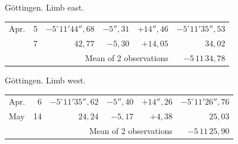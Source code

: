 \noindent\begin{minipage}[t]{.495\textwidth}\centering Göttingen. Limb east.\par\smallskip
{\scriptsize\setlength{\tabcolsep}{1pt}\renewcommand{\arraystretch}{1.2}\begin{tabular}{lr|r|r|r|r|}
Apr.&5&$-5^\circ11'44''{,}68$&$-5''{,}31$&$+14''{,}46$&$-5^\circ11'35''{,}53$\\
&7&$42{,}77$&$-5{,}30$&$+14{,}05$&$34{,}02$\\
\cline{6-6}\multicolumn{5}{r}{Mean of 2 observations}&$-5\,11\,34{,}78$
\end{tabular}}\end{minipage}\hfill\begin{minipage}[t]{.495\textwidth}\centering Göttingen. Limb west.\par\smallskip
{\scriptsize\setlength{\tabcolsep}{1pt}\renewcommand{\arraystretch}{1.2}\begin{tabular}{lr|r|r|r|r}
Apr.&6&$-5^\circ11'35''{,}62$&$-5''{,}40$&$+14''{,}26$&$-5^\circ11'26''{,}76$\\
May&14&$24{,}24$&$-5{,}17$&$+4{,}38$&$25{,}03$\\
\cline{6-6}\multicolumn{5}{r}{Mean of 2 observations}&$-5\,11\,25{,}90$
\end{tabular}}\end{minipage}
\par\vspace{4mm}

